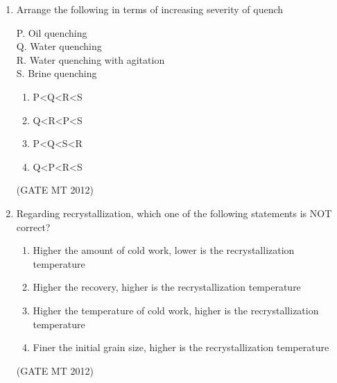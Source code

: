 \documentclass[journal, 11pt, onecolumn]{IEEEtran}
\theoremstyle{remark}
\begin{document}
\begin{enumerate}
\begin{multicols}{2}
\underline{Group 2}
\begin{enumerate}[label=(\arabic*), start=1]
\item bcc 
\item fcc
\item bct
\item Orthorhombic
\end{enumerate}
\end{multicols}

\begin{multicols}{2}
\begin{enumerate}  
\item P-3, Q-4, R-1, S-2
\item P-2, Q-3, R-1, S-4
\item P-3, Q-4, R-2, S-1
\item P-4, Q-3, R-2, S-1
\end{enumerate}
\end{multicols}
\hfill(GATE MT 2012)

\item Arrange the following in terms of increasing severity of quench

P. Oil quenching \\
Q. Water quenching \\
R. Water quenching with agitation \\
S. Brine quenching

\begin{multicols}{2}
\begin{enumerate}  
\item P<Q<R<S
\item Q<R<P<S
\item P<Q<S<R
\item Q<P<R<S
\end{enumerate}
\end{multicols}
\hfill(GATE MT 2012)

\item Regarding recrystallization, which one of the following statements is NOT correct?

\begin{enumerate}  
\item Higher the amount of cold work, lower is the recrystallization temperature
\item Higher the recovery, higher is the recrystallization temperature
\item Higher the temperature of cold work, higher is the recrystallization temperature
\item Finer the initial grain size, higher is the recrystallization temperature
\end{enumerate}
\hfill(GATE MT 2012)


\end{enumerate}
\end{document}
